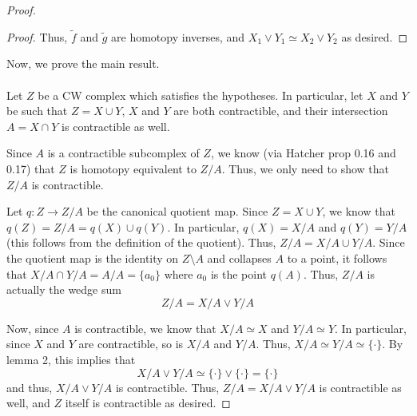 \documentclass[fontsize=11pt]{scrartcl} %
\numberwithin{equation}{section} %
\numberwithin{figure}{section} %
\numberwithin{table}{section} %
\begin{document}
\begin{proof}
\begin{proof}
        Thus, $\tilde{f}$ and $\tilde{g}$ are homotopy inverses, and $X_1\vee
        Y_1\simeq X_2\vee Y_2$ as desired.
    \end{proof}
    Now, we prove the main result.
    \\
    \\
    Let $Z$ be a CW complex which satisfies the hypotheses. In particular, let
    $X$ and $Y$ be such that $Z=X\cup Y$, $X$ and $Y$ are both contractible, and
    their intersection $A=X\cap Y$ is contractible as well.

    Since $A$ is a contractible subcomplex of $Z$, we know (via Hatcher prop
    0.16 and 0.17) that $Z$ is homotopy equivalent to $Z/{A}$. Thus, we only
    need to show that $Z/{A}$ is contractible.

    Let $q:Z\to Z/{A}$ be the canonical quotient map. Since $Z=X\cup Y$, we know
    that $q(Z) = Z/{A} = q(X)\cup q(Y)$. In particular, $q(X) = X/{A}$ and $q(Y)
    = Y/{A}$ (this follows from the definition of the quotient). Thus, $Z/{A} =
    X/{A}\cup Y/{A}$. Since the quotient map is the identity on $Z\setminus A$
    and collapses $A$ to a point, it follows that $X/{A}\cap Y/{A} = A/{A} =
    \{a_0\}$ where $a_0$ is the point $q(A)$. Thus, $Z/{A}$ is actually the wedge
    sum 
    \[
        Z/{A} = X/{A}\vee Y/{A}
    \]
    
    Now, since $A$ is contractible, we know that $X/{A}\simeq X$ and
    $Y/{A}\simeq Y$. In particular, since $X$ and $Y$ are contractible, so is
    $X/{A}$ and $Y/{A}$. Thus, $X/{A}\simeq Y/{A}\simeq \{\cdot\}$. By lemma 2,
    this implies that
    \[
        X/{A}\vee Y/{A} \simeq \{\cdot\}\vee \{\cdot\} = \{\cdot\}
    \]
    and thus, $X/{A}\vee Y/{A}$ is contractible. Thus, $Z/{A} = X/{A}\vee Y/{A}$
    is contractible as well, and $Z$ itself is contractible as desired.
\end{proof}
\end{document}
